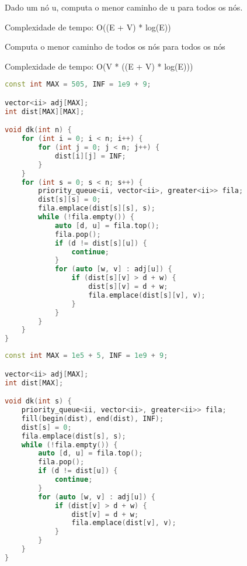 \documentclass[11pt, a4paper, oneside]{book}
\begin{document}
\textbf{} 


Dado um nó u, computa o menor caminho de u para todos os nós.



Complexidade de tempo: O((E + V) * log(E))



\textbf{} 


Computa o menor caminho de todos os nós para todos os nós



Complexidade de tempo: O(V * ((E + V) * log(E)))

\hfill

\begin{multicols}{2}
\begin{lstlisting}[language=C++]
const int MAX = 505, INF = 1e9 + 9;

vector<ii> adj[MAX];
int dist[MAX][MAX];

void dk(int n) {
    for (int i = 0; i < n; i++) {
        for (int j = 0; j < n; j++) {
            dist[i][j] = INF;
        }
    }
    for (int s = 0; s < n; s++) {
        priority_queue<ii, vector<ii>, greater<ii>> fila;
        dist[s][s] = 0;
        fila.emplace(dist[s][s], s);
        while (!fila.empty()) {
            auto [d, u] = fila.top();
            fila.pop();
            if (d != dist[s][u]) {
                continue;
            }
            for (auto [w, v] : adj[u]) {
                if (dist[s][v] > d + w) {
                    dist[s][v] = d + w;
                    fila.emplace(dist[s][v], v);
                }
            }
        }
    }
}
\end{lstlisting}
\end{multicols}

\hfill

\begin{multicols}{2}
\begin{lstlisting}[language=C++]
const int MAX = 1e5 + 5, INF = 1e9 + 9;

vector<ii> adj[MAX];
int dist[MAX];

void dk(int s) {
    priority_queue<ii, vector<ii>, greater<ii>> fila;
    fill(begin(dist), end(dist), INF);
    dist[s] = 0;
    fila.emplace(dist[s], s);
    while (!fila.empty()) {
        auto [d, u] = fila.top();
        fila.pop();
        if (d != dist[u]) {
            continue;
        }
        for (auto [w, v] : adj[u]) {
            if (dist[v] > d + w) {
                dist[v] = d + w;
                fila.emplace(dist[v], v);
            }
        }
    }
}
\end{lstlisting}
\end{multicols}
\end{document}
